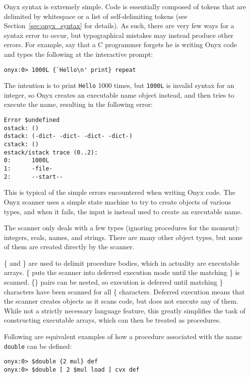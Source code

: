 Onyx syntax is extremely simple.  Code is essentially composed of tokens that
are delimited by whitespace or a list of self-delimiting tokens (see
Section~\ref{sec:onyx_syntax} for details).  As such, there are very few ways
for a syntax error to occur, but typographical mistakes may instead produce
other errors.  For example, say that a C programmer forgets he is writing Onyx
code and types the following at the interactive  prompt:

\begin{verbatim}
onyx:0> 1000L {`Hello\n' print} repeat
\end{verbatim}

The intention is to print {\tt Hello} 1000 times, but {\tt 1000L} is invalid
syntax for an integer, so Onyx creates an executable name object instead, and
then tries to execute the name, resulting in the following error:

\begin{verbatim}
Error $undefined
ostack: ()
dstack: (-dict- -dict- -dict- -dict-)
cstack: ()
estack/istack trace (0..2):
0:      1000L
1:      -file-
2:      --start--
\end{verbatim}

This is typical of the simple errors encountered when writing Onyx code.  The
Onyx scanner uses a simple state machine to try to create objects of various
types, and when it fails, the input is instead used to create an executable
name.

The scanner only deals with a few types (ignoring procedures for the moment):
integers, reals, names, and strings.  There are many other object types, but
none of them are created directly by the scanner.

\{ and \} are used to delimit procedure bodies, which in actuality are
executable arrays.  \{ puts the scanner into deferred execution mode until the
matching \} is scanned.  \{\} pairs can be nested, so execution is deferred
until matching \} characters have been scanned for all \{ characters.  Deferred
execution means that the scanner creates objects as it scans code, but does not
execute any of them.  While not a strictly necessary language feature, this
greatly simplifies the task of constructing executable arrays, which can then be
treated as procedures.

Following are equivalent examples of how a procedure associated with the name
{\tt double} can be defined:

\begin{verbatim}
onyx:0> $double {2 mul} def
onyx:0> $double [ 2 $mul load ] cvx def
\end{verbatim}


